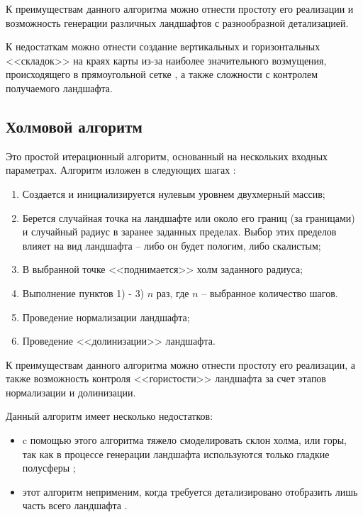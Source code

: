 К преимуществам данного алгоритма можно отнести простоту его реализации и возможность генерации различных ландшафтов с разнообразной детализацией.

К недостаткам можно отнести создание вертикальных и горизонтальных <<складок>> на краях карты из-за наиболее значительного возмущения, происходящего в прямоугольной сетке \cite{info_diaSquWiki}, а также сложности с контролем получаемого ландшафта.

\subsection{Холмовой алгоритм}

Это простой итерационный алгоритм, основанный на нескольких входных параметрах. Алгоритм изложен в следующих шагах \cite{info_hillAlg}:

\begin{enumerate}[label={\arabic*)}]
	\item Создается и инициализируется нулевым уровнем двухмерный массив;
	\item Берется случайная точка на ландшафте или около его границ (за границами) и случайный радиус в заранее заданных пределах. Выбор этих пределов влияет на вид ландшафта -- либо он будет пологим, либо скалистым; 
	\item В выбранной точке <<поднимается>> холм заданного радиуса;
	\item Выполнение пунктов 1) - 3) $n$ раз, где $n$ -- выбранное количество шагов.
	\item Проведение нормализации ландшафта;
	\item Проведение <<долинизации>> ландшафта.
\end{enumerate}

К преимуществам данного алгоритма можно отнести простоту его реализации, а также возможность контроля <<гористости>> ландшафта за счет этапов нормализации и долинизации.

Данный алгоритм имеет несколько недостатков:

\begin{itemize}[label=--]
	\item c помощью этого алгоритма тяжело смоделировать склон холма, или
	горы, так как в процессе генерации ландшафта используются только
	гладкие полусферы \cite{info_hillAlgFlaws};
	\item этот алгоритм неприменим, когда требуется детализировано
	отобразить лишь часть всего ландшафта \cite{info_hillAlgFlaws}.
\end{itemize}

